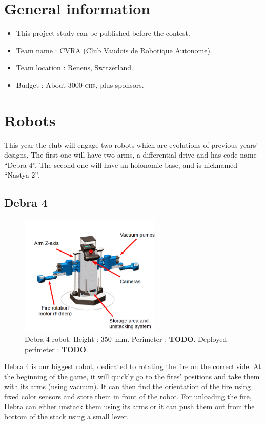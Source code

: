 \documentclass[a4paper]{paper}
\begin{document}

\tableofcontents

\section{General information}
\begin{itemize}
    \item This project study can be published before the contest.
    \item Team name : CVRA (Club Vaudois de Robotique Autonome).
    \item Team location : Renens, Switzerland.
    \item Budget : About 3000 \textsc{chf}, plus sponsors.
\end{itemize}

\section{Robots}
This year the club will engage two robots which are evolutions of previous years' designs.
The first one will have two arms, a differential drive and has code name ``Debra 4''.
The second one will have an holonomic base, and is nicknamed ``Nastya 2''.

\subsection{Debra 4}
\begin{figure}[h]
    \begin{center}
        \includegraphics[width=0.6\textwidth]{images/debra_explained}
        \caption{Debra 4 robot.
            Height : \SI{350}{\milli\meter}.
            Perimeter : \textbf{TODO}.
            Deployed perimeter : \textbf{TODO}.
        }
        \label{fig:balise}
    \end{center}
\end{figure}
Debra 4 is our biggest robot, dedicated to rotating the fire on the correct side.
At the beginning of the game, it will quickly go to the fires' positions and take them with its arms (using vacuum).
It can then find the orientation of the fire using fixed color sensors and store them in front of the robot.
For unloading the fire, Debra can either unstack them using its arms or it can push them out from the bottom of the stack using a small lever.
\end{document}
